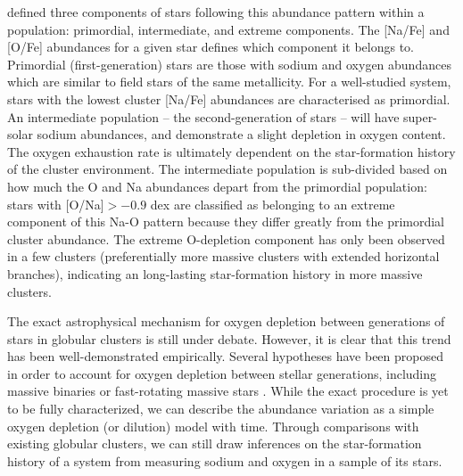 \documentclass{emulateapj}
\begin{document}
\citet{carretta;et-al_2009_na_o} defined three components of stars following this abundance pattern within a population: primordial, intermediate, and extreme components. The [Na/Fe] and [O/Fe] abundances for a given star defines which component it belongs to. Primordial (first-generation) stars are those with sodium and oxygen abundances which are similar to field stars of the same metallicity. For a well-studied system, stars with the lowest cluster [Na/Fe] abundances are characterised as primordial. An intermediate population -- the second-generation of stars -- will have super-solar sodium abundances, and demonstrate a slight depletion in oxygen content. The oxygen exhaustion rate is ultimately dependent on the star-formation history of the cluster environment. The intermediate population is sub-divided based on how much the O and Na abundances depart from the primordial population: stars with [O/Na]$ > -0.9$ dex are classified as belonging to an extreme component of this Na-O pattern because they differ greatly from the primordial cluster abundance. The extreme O-depletion component has only been observed in a few clusters (preferentially more massive clusters with extended horizontal branches), indicating an long-lasting star-formation history in more massive clusters.



The exact astrophysical mechanism for oxygen depletion between generations of stars in globular clusters is still under debate. However, it is clear that this trend has been well-demonstrated empirically. Several hypotheses have been proposed in order to account for oxygen depletion between stellar generations, including massive binaries \citep{de_mink;et-al_2009} or fast-rotating massive stars \citep{decressin;et-al_2007}. While the exact procedure is yet to be fully characterized, we can describe the abundance variation as a simple oxygen depletion (or dilution) model with time. Through comparisons with existing globular clusters, we can still draw inferences on the star-formation history of a system from measuring sodium and oxygen in a sample of its stars.

\end{document}
